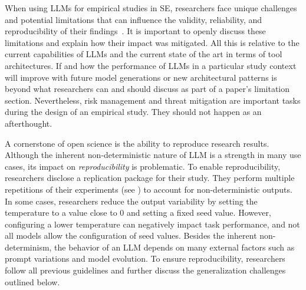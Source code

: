 When using LLMs for empirical studies in SE, researchers face unique challenges and potential limitations that can influence the validity, reliability, and reproducibility of their findings~\cite{sallou2024breaking}.
It is important to openly discuss these limitations and explain how their impact was mitigated.
All this is relative to the current capabilities of LLMs and the current state of the art in terms of tool architectures.
If and how the performance of LLMs in a particular study context will improve with future model generations or new architectural patterns is beyond what researchers can and should discuss as part of a paper's limitation section.
Nevertheless, risk management and threat mitigation are important tasks during the design of an empirical study.
They should not happen as an afterthought.


A cornerstone of open science is the ability to reproduce research results.
Although the inherent non-deterministic nature of LLM is a strength in many use cases, its impact on \emph{reproducibility} is problematic.
To enable reproducibility, researchers \should disclose a replication package for their study.
They \should perform multiple repetitions of their experiments (see \benchmarksmetrics) to account for non-deterministic outputs.
In some cases, researchers \may reduce the output variability by setting the temperature to a value close to 0 and setting a fixed seed value.
However, configuring a lower temperature can negatively impact task performance, and not all models allow the configuration of seed values.
Besides the inherent non-determinism, the behavior of an LLM depends on many external factors such as prompt variations and model evolution.
To ensure reproducibility, researchers \should follow all previous guidelines and further discuss the generalization challenges outlined below.

